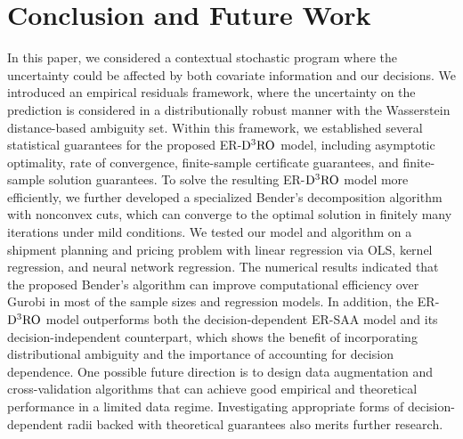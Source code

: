 \documentclass[onefignum,onetabnum]{siamart251216}
\begin{document}
\section{Conclusion and Future Work}\label{sec: future work}
In this paper, we considered a contextual stochastic program where the uncertainty could be affected by both covariate information and our decisions. We introduced an empirical residuals framework, where the uncertainty on the prediction is considered in a distributionally robust manner with the Wasserstein distance-based ambiguity set. Within this framework, we established several statistical guarantees for the proposed ER-$\rm{D^3RO}$ model, including asymptotic optimality, rate of convergence, finite-sample certificate guarantees, and finite-sample solution guarantees. To solve the resulting ER-$\rm{D^3RO}$ model more efficiently, we further developed a specialized Bender's decomposition algorithm with nonconvex cuts, which can converge to the optimal solution in finitely many iterations under mild conditions. We tested our model and algorithm on a shipment planning and pricing problem with linear regression via OLS, kernel regression, and neural network regression. The numerical results indicated that the proposed Bender's algorithm can improve computational efficiency over Gurobi in most of the sample sizes and regression models. In addition, the ER-$\rm{D^3RO}$ model outperforms both the decision-dependent ER-SAA model and its decision-independent counterpart, which shows the benefit of incorporating distributional ambiguity and the importance of accounting for decision dependence.
One possible future direction is to design data augmentation and cross-validation algorithms that can achieve good empirical and theoretical performance in a limited data regime. Investigating appropriate forms of decision-dependent radii backed with theoretical guarantees also merits further research. 

\vspace*{-0.05in}


\end{document}

